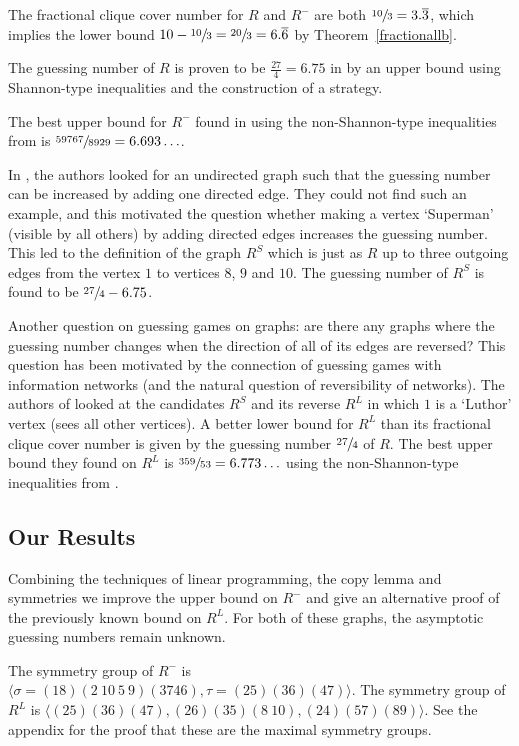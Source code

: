 \documentclass[11pt, a4paper]{kybernetika}
\begin{document}
	The fractional clique cover number for $R$ and $R^-$ are both $\sfrac{10}3=3.\overline{3}$, which implies the lower bound $10-\sfrac{10}3=\sfrac{20}3=6.\overline{6}$ by Theorem~\ref{fractionallb}.
	
	The guessing number of $R$ is proven to be $\frac{27}4=6.75$ in \cite{baber2016graph} by an upper bound using Shannon-type inequalities and the construction of a strategy.
	
	The best upper bound for $R^-$ found in \cite{baber2016graph} using the non-Shannon-type inequalities from \cite{dougherty2011non} is $\sfrac{59767}{8929}=6.693\ldots$. 
	
	In \cite{baber2016graph}, the authors looked for an undirected graph such that the guessing number can be increased by adding one directed edge. They could not find such an example, and this motivated the question whether making a vertex `Superman' (visible by all others) by adding directed edges increases the guessing number. This led to the definition of the graph $R^S$ which is just as $R$ up to three outgoing edges from the vertex $1$ to vertices $8$, $9$ and $10$. The guessing number of $R^S$ is found to be $\sfrac{27}4-6.75$.
	
	Another question on guessing games on graphs: are there any graphs where the guessing number changes when the direction of all of its edges are reversed? This question has been motivated by the connection of guessing games with information networks (and the natural question of reversibility of networks). The authors of \cite{baber2016graph} looked at the candidates $R^S$ and its reverse $R^L$ in which $1$ is a `Luthor' vertex (sees all other vertices). A better lower bound for $R^L$ than its fractional clique cover number is given by the guessing number $\sfrac{27}4$ of $R$. The best upper bound they found on $R^L$ is $\sfrac{359}{53}=6.773\ldots$ using the non-Shannon-type inequalities from \cite{dougherty2011non}.
	
	\subsection{Our Results}\label{s:our-res}
	
	Combining the techniques of linear programming, the copy lemma and symmetries we improve the upper bound on $R^-$ and give an alternative proof of the previously known bound on $R^L$. For both of these graphs, the asymptotic guessing numbers remain unknown.
	
	The symmetry group of $R^-$ is $\langle\sigma=(18)(2\ 10\ 5\ 9)(3746),\tau=(25)(36)(47)\rangle$. The symmetry group of $R^L$ is $\langle(25)(36)(47),(26)(35)(8\ 10),(24)(57)(89)\rangle$. See the appendix for the proof that these are the maximal symmetry groups.
	
\end{document}
